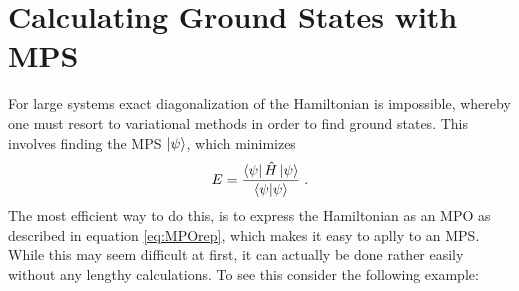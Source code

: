 \chapter{Calculating Ground States with MPS}
For large systems exact diagonalization of the Hamiltonian is impossible, whereby one must resort to variational methods in order to find ground states. This involves finding the MPS $\ket{\psi}$, which minimizes
\begin{equation}
	E = \frac{\bra{\psi} \hat{H} \ket{\psi}}{\braket{\psi | \psi}} \; .
\end{equation}
The most efficient way to do this, is to express the Hamiltonian as an MPO as described in equation \ref{eq:MPOrep}, which makes it easy to aplly to an MPS. While this may seem difficult at first, it can actually be done rather easily without any lengthy calculations. To see this consider the following example:

